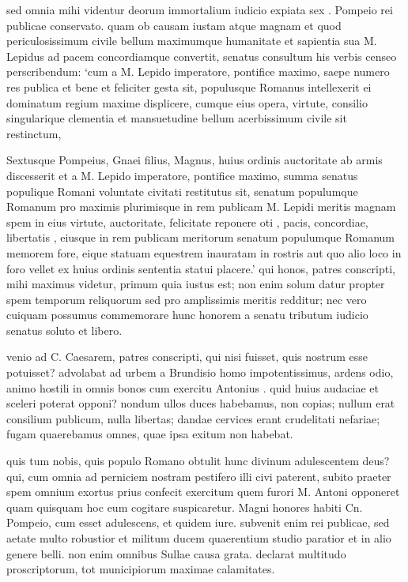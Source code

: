  sed omnia mihi videntur deorum immortalium iudicio expiata sex . Pompeio rei publicae conservato. quam ob causam iustam atque magnam et quod periculosissimum civile bellum maximumque humanitate et sapientia sua M. Lepidus ad pacem concordiamque convertit, senatus consultum his verbis censeo perscribendum: `cum a M. Lepido imperatore, pontifice maximo, saepe numero res publica et bene et feliciter gesta sit, populusque Romanus intellexerit ei dominatum regium maxime displicere, cumque eius opera, virtute, consilio singularique clementia et mansuetudine bellum acerbissimum civile sit restinctum,

 Sextusque Pompeius, Gnaei filius, Magnus, huius ordinis auctoritate ab armis discesserit et a M. Lepido imperatore, pontifice maximo, summa senatus populique Romani voluntate civitati restitutus sit, senatum populumque Romanum pro maximis plurimisque in rem publicam M. Lepidi meritis magnam spem in eius virtute, auctoritate, felicitate reponere oti , pacis, concordiae, libertatis , eiusque in rem publicam meritorum senatum populumque Romanum memorem fore, eique statuam equestrem inauratam in rostris aut quo alio loco in foro vellet ex huius ordinis sententia statui placere.' qui honos, patres conscripti, mihi maximus videtur, primum quia iustus est; non enim solum datur propter spem temporum reliquorum sed pro amplissimis meritis redditur; nec vero cuiquam possumus commemorare hunc honorem a senatu tributum iudicio senatus soluto et libero.

 venio ad C. Caesarem, patres conscripti, qui nisi fuisset, quis nostrum esse potuisset? advolabat ad urbem a Brundisio homo impotentissimus, ardens odio, animo hostili in omnis bonos cum exercitu Antonius . quid huius audaciae et sceleri poterat opponi? nondum ullos duces habebamus, non copias; nullum erat consilium publicum, nulla libertas; dandae cervices erant crudelitati nefariae; fugam quaerebamus omnes, quae ipsa exitum non habebat.

 quis tum nobis, quis populo Romano obtulit hunc divinum adulescentem deus? qui, cum omnia ad perniciem nostram pestifero illi civi paterent, subito praeter spem omnium exortus prius confecit exercitum quem furori M. Antoni opponeret quam quisquam hoc eum cogitare suspicaretur. Magni honores habiti Cn. Pompeio, cum esset adulescens, et quidem iure. subvenit enim rei publicae, sed aetate multo robustior et militum ducem quaerentium studio paratior et in alio genere belli. non enim omnibus Sullae causa grata. declarat multitudo proscriptorum, tot municipiorum maximae calamitates.

